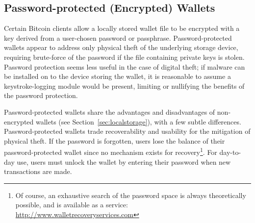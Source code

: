 
\subsection{Password-protected (Encrypted) Wallets}
Certain Bitcoin clients allow a locally stored wallet file to be encrypted with a key derived from a user-chosen password or passphrase. 
Password-protected wallets appear to address only physical theft of the underlying storage device, requiring brute-force of the password if the file containing private keys is stolen. Password protection seems less useful in the case of digital theft; if malware can be installed on to the device storing the wallet, it is reasonable to assume a keystroke-logging module would be present, limiting or nullifying the benefits of the password protection.

Password-protected wallets share the advantages and disadvantages of non-encrypted wallets (see Section~\ref{sec:localstorage}), with a few subtle differences. Password-protected wallets trade recoverability and usability for the mitigation of physical theft. If the password is forgotten, users lose the balance of their password-protected wallet since no mechanism exists for recovery\footnote{Of course, an exhaustive search of the password space is always theoretically possible, and is available as a service: \url{http://www.walletrecoveryservices.com}}. For day-to-day use, users must unlock the wallet by entering their password when new transactions are made. 

